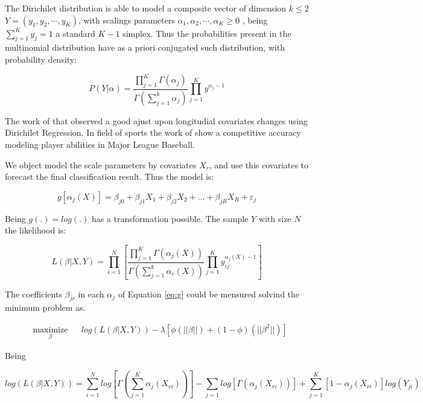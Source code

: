 \documentclass[review]{elsarticle}
\begin{document}
The Dirichilet distribution is able to model a composite vector of dimension $k\leq 2$ $Y = (y_1,y_2,\cdots,y_K)$, with scalings parameters $\alpha_1,\alpha_2,\cdots,\alpha_K\geq 0$ , being  $\sum_{j=1}^K y_j = 1$ a standard $K-1$ simplex. Thus the probabilities present in the multinomial distribution have as a priori conjugated such distribution, with probability density:


\begin{equation}
P(Y |\alpha) = \frac{\prod_{j=1}^K\Gamma(\alpha_j)}{\Gamma(\sum_{j=1}^k\alpha_j)}\prod_{j=1}^K y^{\alpha_j - 1}
\end{equation}


The work of \cite{Hijazi2009} that observed a good ajust upon longitudial covariates changes using Dirichilet Regression. In field of sports the work of \cite{Null2009} show a competitive accuracy modeling player abilities in Major League Baseball.

We object model the scale parameters by covariates $X_r$, and use this covariates to forecast the final classification result. Thus the model is:

\begin{equation}
g[\alpha_j(X)] =  \beta_{j0} + \beta_{j1} X_1 + \beta_{j2} X_2 + ... + \beta_{jR} X_R + \varepsilon_{j}
\label{eq:g}
\end{equation}

Being $g(.) = log(.)$  has a transformation possible.  The sample $Y$ with size $N$ the likelihood is:

\begin{equation*}
 L(\beta|X,Y) = \prod_{i=1}^N\left[ \frac{\prod_{j=1}^K\Gamma\left(\alpha_j(X)\right)}{\Gamma\left(\sum_{j=1}^k\alpha_c(X)\right)}\prod_{j=1}^K y_{ij}^{\alpha_j(X) - 1}\right]
 \end{equation*}
 

The coefficients $\beta_{jr}$ in each $\alpha_j$ of Equation \ref{eq:g} could be mensured solvind the minimum problem as.

\begin{equation}
\begin{aligned}
& \underset{\beta}{\text{maximize}}
& &   log(L(\beta|X,Y)) - \lambda\left[\phi(||\beta||) + (1-\phi)(||\beta^2||)\right]
\end{aligned}
\label{eq:vero}
 \end{equation}
 
 Being
 
\begin{equation*}
 log(L(\beta|X,Y)) = \sum_{i=1}^N log\left[\Gamma\left(\sum_{j=1}^K\alpha_j(X_{ri})\right)\right]	-\sum_{j=1}log\left[\Gamma\left(\alpha_j(X_{ri})\right)\right] + \sum_{j=1}^K[1-\alpha_j(X_{ri})]log\left(Y_{ji}\right)
 \label{eq:objfunc}
 \end{equation*}
\end{document}
